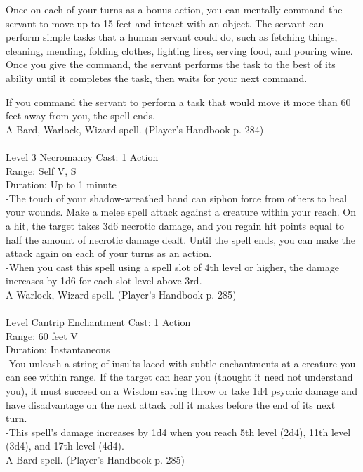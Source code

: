 \documentclass[10pt,twocolumn]{report}
\begin{document}
Once on each of your turns as a bonus action, you can mentally command the servant to move up to 15 feet and inteact with an object. The servant can perform simple tasks that a human servant could do, such as fetching things, cleaning, mending, folding clothes, lighting fires, serving food, and pouring wine. Once you give the command, the servant performs the task to the best of its ability until it completes the task, then waits for your next command.

If you command the servant to perform a task that would move it more than 60 feet away from you, the spell ends.\\
A Bard, Warlock, Wizard spell. (Player's Handbook p. 284) \\


 \\
Level 3 \quad Necromancy \quad Cast: 1 Action\\
Range: Self \quad V, S\\
Duration: Up to 1 minute \quad \\
-The touch of your shadow-wreathed hand can siphon force from others to heal your wounds. Make a melee spell attack against a creature within your reach. On a hit, the target takes 3d6 necrotic damage, and you regain hit points equal to half the amount of necrotic damage dealt. Until the spell ends, you can make the attack again on each of your turns as an action.\\
-When you cast this spell using a spell slot of 4th level or higher, the damage increases by 1d6 for each slot level above 3rd.\\
A Warlock, Wizard spell. (Player's Handbook p. 285) \\


 \\
Level Cantrip \quad Enchantment \quad Cast: 1 Action\\
Range: 60 feet \quad V\\
Duration: Instantaneous \quad \\
-You unleash a string of insults laced with subtle enchantments at a creature you can see within range.
If the target can hear you (thought it need not understand you), it must succeed on a Wisdom saving throw or take 1d4 psychic damage and have disadvantage on the next attack roll it makes before the end of its next turn.\\
-This spell’s damage increases by 1d4 when you reach 5th level (2d4), 11th level (3d4), and 17th level (4d4).\\
A Bard spell. (Player's Handbook p. 285) \\
\end{document}
